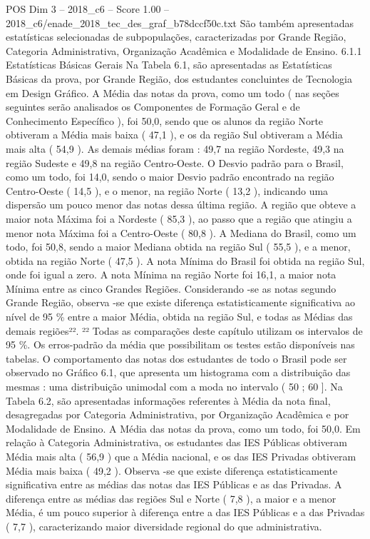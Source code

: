 \begin{textsample}{POS Dim 3 – 2018\_c6 – Score 1.00 – 2018\_c6/enade\_2018\_tec\_des\_graf\_b78dccf50c.txt}
São também apresentadas estatísticas selecionadas de subpopulações, caracterizadas por Grande Região, Categoria Administrativa, Organização Acadêmica e Modalidade de Ensino. 6.1.1 Estatísticas Básicas Gerais Na Tabela 6.1, são apresentadas as Estatísticas Básicas da prova, por Grande Região, dos estudantes concluintes de Tecnologia em Design Gráfico.
A Média das notas da prova, como um todo ( nas seções seguintes serão analisados os Componentes de Formação Geral e de Conhecimento Específico ), foi 50,0, sendo que os alunos da região Norte obtiveram a Média mais baixa ( 47,1 ), e os da região Sul obtiveram a Média mais alta ( 54,9 ).
As demais médias foram : 49,7 na região Nordeste, 49,3 na região Sudeste e 49,8 na região Centro-Oeste.
O Desvio padrão para o Brasil, como um todo, foi 14,0, sendo o maior Desvio padrão encontrado na região Centro-Oeste ( 14,5 ), e o menor, na região Norte ( 13,2 ), indicando uma dispersão um pouco menor das notas dessa última região.
A região que obteve a maior nota Máxima foi a Nordeste ( 85,3 ), ao passo que a região que atingiu a menor nota Máxima foi a Centro-Oeste ( 80,8 ).
A Mediana do Brasil, como um todo, foi 50,8, sendo a maior Mediana obtida na região Sul ( 55,5 ), e a menor, obtida na região Norte ( 47,5 ).
A nota Mínima do Brasil foi obtida na região Sul, onde foi igual a zero.
A nota Mínima na região Norte foi 16,1, a maior nota Mínima entre as cinco Grandes Regiões.
Considerando -se as notas segundo Grande Região, observa -se que existe diferença estatisticamente significativa ao nível de 95 \% entre a maior Média, obtida na região Sul, e todas as Médias das demais regiões²². ²² Todas as comparações deste capítulo utilizam os intervalos de 95 \%.
Os erros-padrão da média que possibilitam os testes estão disponíveis nas tabelas.
O comportamento das notas dos estudantes de todo o Brasil pode ser observado no Gráfico 6.1, que apresenta um histograma com a distribuição das mesmas : uma distribuição unimodal com a moda no intervalo ( 50 ; 60 ].
Na Tabela 6.2, são apresentadas informações referentes à Média da nota final, desagregadas por Categoria Administrativa, por Organização Acadêmica e por Modalidade de Ensino.
A Média das notas da prova, como um todo, foi 50,0.
Em relação à Categoria Administrativa, os estudantes das IES Públicas obtiveram Média mais alta ( 56,9 ) que a Média nacional, e os das IES Privadas obtiveram Média mais baixa ( 49,2 ).
Observa -se que existe diferença estatisticamente significativa entre as médias das notas das IES Públicas e as das Privadas.
A diferença entre as médias das regiões Sul e Norte ( 7,8 ), a maior e a menor Média, é um pouco superior à diferença entre a das IES Públicas e a das Privadas ( 7,7 ), caracterizando maior diversidade regional do que administrativa.

\end{textsample}
